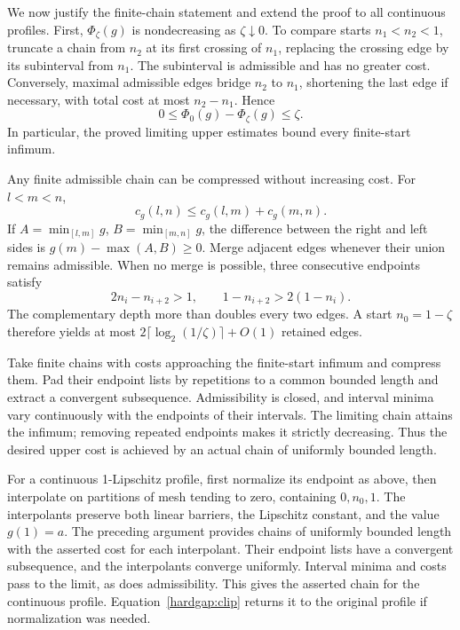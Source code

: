 We now justify the finite-chain statement and extend the proof to all
continuous profiles. First, \(\Phi_\zeta(g)\) is nondecreasing as
\(\zeta\downarrow0\). To compare starts \(n_1<n_2<1\), truncate
a chain from \(n_2\) at its first crossing of \(n_1\), replacing the
crossing edge by its subinterval from \(n_1\). The subinterval is
admissible and has no greater cost. Conversely, maximal admissible edges
bridge \(n_2\) to \(n_1\), shortening the last edge if necessary,
with total cost at most \(n_2-n_1\). Hence
\begin{equation}\label{hardgap:start-error}
 0\le\Phi_0(g)-\Phi_\zeta(g)\le\zeta.
\end{equation}
In particular, the proved limiting upper estimates bound every finite-start
infimum.

Any finite admissible chain can be compressed without increasing cost.
For \(l<m<n\),
\begin{equation}\label{hardgap:merge}
 c_g(l,n)\le c_g(l,m)+c_g(m,n).
\end{equation}
If \(A=\min_{[l,m]}g\), \(B=\min_{[m,n]}g\), the difference
between the right and left sides is \(g(m)-\max(A,B)\ge0\).
Merge adjacent edges whenever their union remains admissible. When no
merge is possible, three consecutive endpoints satisfy
\[
 2n_i-n_{i+2}>1,\qquad
 1-n_{i+2}>2(1-n_i).
\]
The complementary depth more than doubles every two edges. A start
\(n_0=1-\zeta\) therefore yields at most
\(2\lceil\log_2(1/\zeta)\rceil+O(1)\) retained edges.

Take finite chains with costs approaching the finite-start infimum and
compress them. Pad their endpoint lists by repetitions to a common bounded
length and extract a convergent subsequence. Admissibility is closed, and
interval minima vary continuously with the endpoints of their intervals.
The limiting chain attains the infimum; removing repeated endpoints makes
it strictly decreasing. Thus the desired upper cost is achieved by an
actual chain of uniformly bounded length.

For a continuous 1-Lipschitz profile, first normalize its endpoint as above,
then interpolate on partitions of mesh tending to zero, containing
\(0,n_0,1\). The interpolants preserve both linear barriers, the
Lipschitz constant, and the value \(g(1)=a\). The preceding argument
provides chains of uniformly bounded length with the asserted cost for
each interpolant. Their endpoint lists have a convergent subsequence, and
the interpolants converge uniformly. Interval minima and costs pass to the
limit, as does admissibility. This gives the asserted chain for the
continuous profile. Equation~\eqref{hardgap:clip} returns it to the
original profile if normalization was needed.

